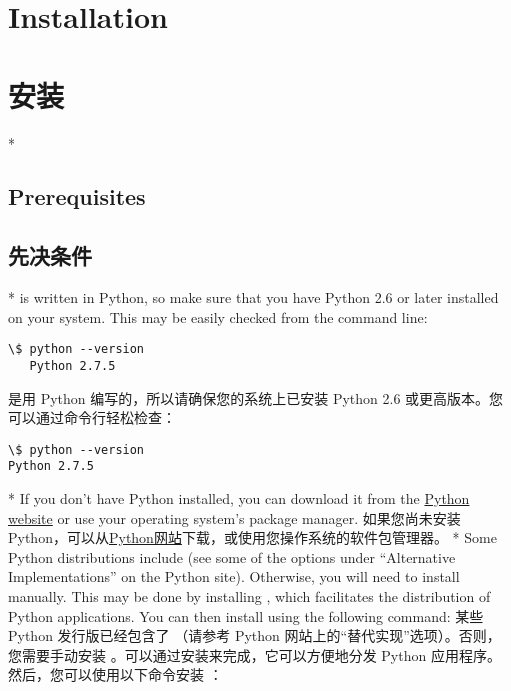 \begin{paracol}{2}
\section{Installation} 
\switchcolumn
\section{安装}
\switchcolumn[0]*%
\subsection{Prerequisites}
\switchcolumn
\subsection{先决条件}
\switchcolumn[0]*%
 is written in Python, so make sure that you have Python 2.6 or later installed on your system.  This may be easily checked from the command line:
\begin{Verbatim}[gobble=3,commandchars=\\\{\}]
   \$ python --version
   Python 2.7.5
\end{Verbatim}
\switchcolumn
{} 是用 Python 编写的，所以请确保您的系统上已安装 Python 2.6 或更高版本。您可以通过命令行轻松检查：
\begin{Verbatim}[gobble=0,commandchars=\\\{\}]
\$ python --version
Python 2.7.5
\end{Verbatim}
\switchcolumn[0]*%
If you don't have Python installed, you can download it from the \href{http://www.python.org/download/}{Python website} or
use your operating system's package manager.
\switchcolumn
如果您尚未安装 Python，可以从\href{http://www.python.org/download/}{Python网站}下载，或使用您操作系统的软件包管理器。
\switchcolumn[0]*%
Some Python distributions include  (see some of the options under ``Alternative Implementations'' on the Python site).  Otherwise, you will need to install  manually. This may  be done by installing \href{http://pypi.python.org/pypi/setuptools}{}, which facilitates the distribution of Python applications.  You can then install  using the following command:
\switchcolumn
某些 Python 发行版已经包含了 （请参考 Python 网站上的“替代实现”选项）。否则，您需要手动安装 。可以通过安装\href{http://pypi.python.org/pypi/setuptools}{}来完成，它可以方便地分发 Python 应用程序。然后，您可以使用以下命令安装 ：

\end{paracol}
